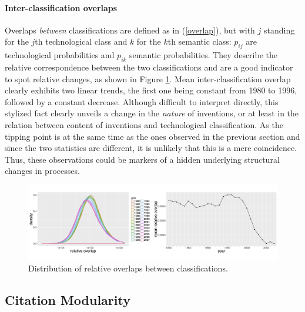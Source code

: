 \documentclass[article]{article}%
\begin{document}
\paragraph{Inter-classification overlaps}

Overlaps \emph{between} classifications are defined as in (\ref{overlap}), but with $j$ standing for the $j$th technological class and $k$ for the $k$th semantic class: $p_{ij}$ are technological probabilities and $p_{ik}$ semantic probabilities. They describe the relative correspondence between the two classifications and are a good indicator to spot relative changes, as shown in Figure \ref{fig:inter-classif-overlap}. Mean inter-classification overlap clearly exhibits two linear trends, the first one being constant from 1980 to 1996, followed by a constant decrease. Although difficult to interpret directly, this stylized fact clearly unveils a change in the \emph{nature} of inventions, or at least in the relation between content of inventions and technological classification. As the tipping point is at the same time as the ones observed in the previous section and since the two statistics are different, it is unlikely that this is a mere coincidence. Thus, these observations could be markers of a hidden underlying structural changes in processes. 




\begin{figure}[!ht]
\includegraphics[width=\textwidth]{figures/Fig8}
\caption{Distribution of relative overlaps between classifications.} 
\label{fig:inter-classif-overlap}
\end{figure}





\subsection{Citation Modularity}
\label{citationmodularity}
\end{document}
